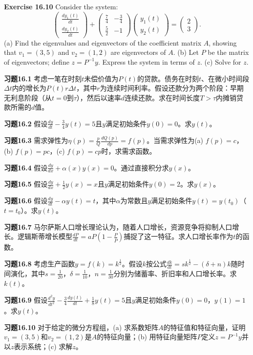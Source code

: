 \begin{original}
\textbf{Exercise 16.10} Consider the system:
\[
\begin{pmatrix} \frac{d y_1(t)}{dt} \\ \frac{d y_2(t)}{dt} \end{pmatrix} + \begin{pmatrix} \frac{7}{4} & -\frac{3}{4} \\ \frac{5}{2} & -1 \end{pmatrix} \begin{pmatrix} y_1(t) \\ y_2(t) \end{pmatrix} = \begin{pmatrix} 2 \\ 3 \end{pmatrix}.
\]
(a) Find the eigenvalues and eigenvectors of the coefficient matrix $A$, showing that $v_1 = (3,5)$ and $v_2 = (1,2)$ are eigenvectors of $A$.
(b) Let $P$ be the matrix of eigenvectors; define $z = P^{-1}y$. Express the system in terms of $z$.
(c) Solve for $z$.
\end{original}
\begin{translation}
\textbf{习题16.1} 考虑一笔在时刻$t$未偿价值为$P(t)$的贷款。债务在时刻$t$、在微小时间段$\Delta t$内的增长为$P(t)r\Delta t$，其中$r$为连续时间利率。假设还款分为两个阶段：早期无利息阶段（从$t = 0$到$\tau$），然后以速率$d$连续还款。求在时间长度$T > \tau$内摊销贷款所需的$d$值。

\textbf{习题16.2} 假设$\frac{dy}{dt} - \frac{3}{4}y(t) = 5$且$y$满足初始条件$y(0) = 0$。求$y(t)$。

\textbf{习题16.3} 需求弹性为$\eta(p) = \frac{p}{Q}\frac{dQ(p)}{dp} = f(p)$。当需求弹性为(a) $f(p) = c$，(b) $f(p) = pc$，(c) $f(p) = cp$时，求需求函数。

\textbf{习题16.4} 假设$\frac{dy}{dx} + \alpha(x)y(x) = 0$。通过直接积分求$y(x)$。

\textbf{习题16.5} 假设$\frac{dy}{dx} + \frac{1}{2}y(x) = x$且$y$满足初始条件$y(0) = 2$。求$y(x)$。

\textbf{习题16.6} 假设$\frac{dy}{dt} - \alpha y(t) = t$，其中$\alpha$为常数且$y$满足初始条件$y(t) = y(t_0)$（$t = t_0$）。求$y(t)$。

\textbf{习题16.7} 马尔萨斯人口增长理论认为，随着人口增长，资源竞争将抑制人口增长。逻辑斯蒂增长模型$\frac{dP}{dt} = aP(1 - \frac{P}{\bar{P}})$捕捉了这一特征。求人口增长率作为$t$的函数。

\textbf{习题16.8} 考虑生产函数$y = f(k) = k^{\frac{1}{2}}$。假设$k$按公式$\frac{dk}{dt} = sk^{\frac{1}{2}} - (\delta + n)k$随时间演化，其中$s = \frac{1}{20}$，$\delta = \frac{1}{10}$，$n = \frac{1}{30}$分别为储蓄率、折旧率和人口增长率。求$k(t)$。

\textbf{习题16.9} 假设$\frac{d^2 y}{dt^2} - \frac{3}{4}\frac{d y(t)}{dt} + \frac{1}{8}y(t) = 5$且$y$满足初始条件$y(0) = 0$，$y(1) = 1$。求$y(t)$。

\textbf{习题16.10} 对于给定的微分方程组，(a) 求系数矩阵$A$的特征值和特征向量，证明$v_1 = (3,5)$和$v_2 = (1,2)$是$A$的特征向量；(b) 用特征向量矩阵$P$定义$z = P^{-1}y$并以$z$表示系统；(c) 求解$z$。
\end{translation}

